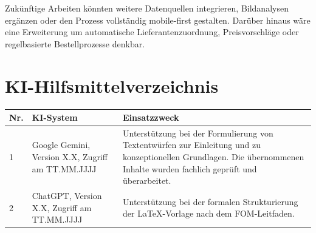 \documentclass[12pt,a4paper]{article}
\begin{document}
Zukünftige Arbeiten könnten weitere Datenquellen integrieren, Bildanalysen ergänzen oder den Prozess vollständig mobile-first gestalten. Darüber hinaus wäre eine Erweiterung um automatische Lieferantenzuordnung, Preisvorschläge oder regelbasierte Bestellprozesse denkbar.

\newpage
{}
{}
\lstlistoflistings

\newpage
\printbibliography[heading=bibintoc, title={Literaturverzeichnis}]

\newpage
\section*{KI-Hilfsmittelverzeichnis}

\begin{tabular}{@{}p{1cm}p{4cm}p{9.5cm}@{}}
\toprule
\textbf{Nr.} & \textbf{KI-System} & \textbf{Einsatzzweck} \\ 
\midrule
1 & Google Gemini, Version X.X, Zugriff am TT.MM.JJJJ & Unterstützung bei der Formulierung von Textentwürfen zur Einleitung und zu konzeptionellen Grundlagen. Die übernommenen Inhalte wurden fachlich geprüft und überarbeitet. \\
2 & ChatGPT, Version X.X, Zugriff am TT.MM.JJJJ & Unterstützung bei der formalen Strukturierung der LaTeX-Vorlage nach dem FOM-Leitfaden. \\
\bottomrule
\end{tabular}
\end{document}

